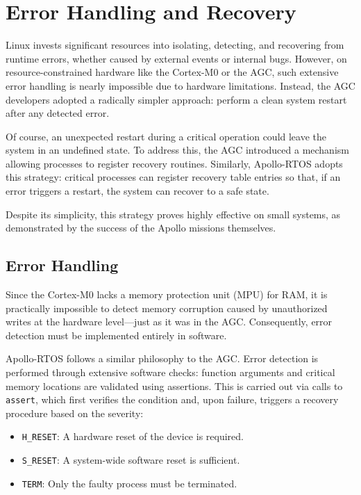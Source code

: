 \section{Error Handling and Recovery}
\label{sec:rec}

Linux invests significant resources into isolating, detecting, and recovering from
runtime errors, whether caused by external events or internal bugs. However, on
resource-constrained hardware like the Cortex-M0 or the AGC, such extensive error
handling is nearly impossible due to hardware limitations. Instead, the AGC developers
adopted a radically simpler approach: perform a clean system restart after any detected
error.

Of course, an unexpected restart during a critical operation could leave the system in
an undefined state. To address this, the AGC introduced a mechanism allowing processes
to register recovery routines. Similarly, Apollo-RTOS adopts this strategy: critical
processes can register recovery table entries so that, if an error triggers a restart,
the system can recover to a safe state.

Despite its simplicity, this strategy proves highly effective on small systems, as
demonstrated by the success of the Apollo missions themselves.

\subsection{Error Handling}

Since the Cortex-M0 lacks a memory protection unit (MPU) for RAM, it is practically
impossible to detect memory corruption caused by unauthorized writes at the hardware
level—just as it was in the AGC. Consequently, error detection must be implemented
entirely in software.

Apollo-RTOS follows a similar philosophy to the AGC. Error detection is performed
through extensive software checks: function arguments and critical memory locations are
validated using assertions. This is carried out via calls to
\lstinline[style=myagc]|assert|, which first verifies the condition and, upon failure,
triggers a recovery procedure based on the severity: 
\begin{itemize}
    \item \lstinline[style=myagc]|H_RESET|: A hardware reset of the device is required.
    \item \lstinline[style=myagc]|S_RESET|: A system-wide software reset is sufficient.
    \item \lstinline[style=myagc]|TERM|: Only the faulty process must be terminated.
\end{itemize}

